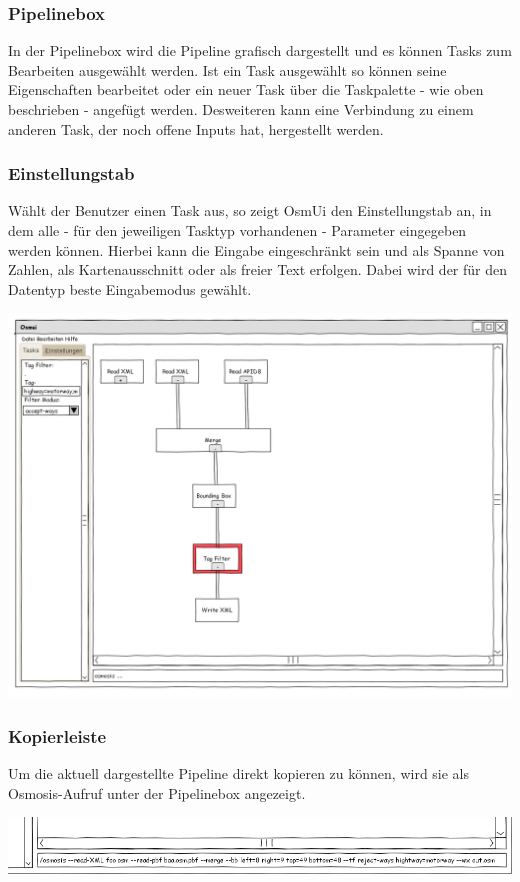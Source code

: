 \documentclass[a4paper,12pt]{scrartcl}
\begin{document}
\subsubsection{Pipelinebox}
In der Pipelinebox wird die Pipeline grafisch dargestellt und es können Tasks zum Bearbeiten ausgewählt werden. Ist ein Task ausgewählt so können seine Eigenschaften
bearbeitet oder ein neuer Task über die Taskpalette - wie oben beschrieben - angefügt werden. Desweiteren kann eine Verbindung zu einem anderen Task, der noch offene
Inputs hat, hergestellt werden.
\subsubsection{Einstellungstab}
Wählt der Benutzer einen Task aus, so zeigt OsmUi den Einstellungstab an, in dem alle - für den jeweiligen Tasktyp vorhandenen - Parameter eingegeben werden können.
Hierbei kann die Eingabe eingeschränkt sein und als Spanne von Zahlen, als Kartenausschnitt oder als freier Text erfolgen. Dabei wird der für
den Datentyp beste Eingabemodus gewählt.\\
\begin{center}
\includegraphics[width=15cm]{ui_prototype/OsmUi_Parameter_Optionen.png}
\end{center}
\subsubsection{Kopierleiste}
Um die aktuell dargestellte Pipeline direkt kopieren zu können, wird sie als Osmosis-Aufruf unter der Pipelinebox angezeigt.
\begin{center}
\includegraphics[width=15cm]{ui_prototype/OsmUi_Leisteklein.png}
\end{center}
\end{document}
